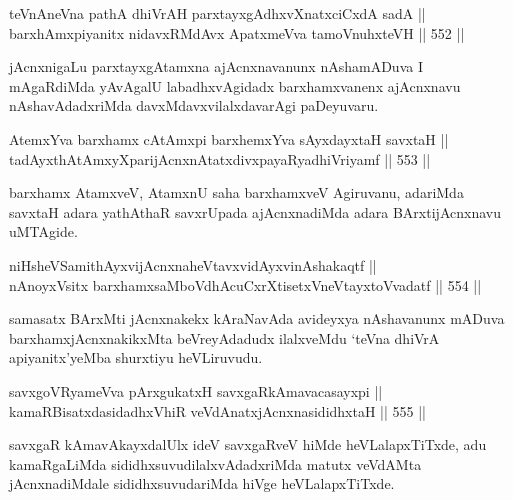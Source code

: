 \begin{shl}
teVnAneVna pathA dhiVrAH parxtayxgAdhxvXnatxciCxdA sadA || \\
barxhAmxpiyanitx nidavxRMdAvx ApatxmeVva tamoVnuhxteVH \hfill || 552 ||  
\end{shl}

\begin{artha}
jAcnxnigaLu parxtayxgAtamxna ajAcnxnavanunx nAshamADuva I mAgaRdiMda
yAvAgalU labadhxvAgidadx barxhamxvanenx ajAcnxnavu nAshavAdadxriMda
davxMdavxvilalxdavarAgi paDeyuvaru.
\end{artha}

\begin{shl}
AtemxYva barxhamx cA\s \s tAmx\s pi barxhemxYva sAyxdayxtaH savxtaH || \\
tadAyxthAtAmxyXparijAcnxnAtatxdivxpayaRyadhiVriyamf \hfill || 553 ||  
\end{shl}

\begin{artha}
barxhamx AtamxveV, AtamxnU saha barxhamxveV Agiruvanu, adariMda
savxtaH adara yathAthaR savxrUpada ajAcnxnadiMda adara BArxtijAcnxnavu
uMTAgide.
\end{artha}

\begin{shl}
niHsheVSamithAyxvijAcnxnaheVtavxvidAyxvinAshakaqtf || \\
nAnoyxV\s sitx barxhamxsaMboVdhAcuCxrXtisetxVneVtayxtoV\s vadatf \hfill || 554 ||  
\end{shl}

\begin{artha}
samasatx BArxMti jAcnxnakekx kAraNavAda avideyxya nAshavanunx mADuva
barxhamxjAcnxnakikxMta beVreyAdadudx ilalxveMdu `teVna dhiVrA
apiyanitx'yeMba shurxtiyu heVLiruvudu.
\end{artha}


\begin{shl}
savxgoVR\s yameVva pArxgukatxH savxgaRkAmavacasayxpi || \\
kamaRBisatxdasidadhxVhiR veVdAnatxjAcnxnasididhxtaH \hfill || 555 ||  
\end{shl}

\begin{artha}
savxgaR kAmavAkayxdalUlx ideV savxgaRveV hiMde heVLalapxTiTxde, adu
kamaRgaLiMda sididhxsuvudilalxvAdadxriMda matutx veVdAMta
jAcnxnadiMdale sididhxsuvudariMda hiVge heVLalapxTiTxde.
\end{artha}

